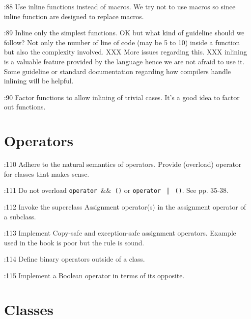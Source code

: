 \documentclass{book}
\newcommand{\name}[1]{\texttt{#1}}
\begin{document}
\cite{OKL_MisfeldtBumgardnerGray2004CppStyle}:88 Use inline functions instead of macros. We try not to use macros so since inline function are designed to replace macros.

\cite{OKL_MisfeldtBumgardnerGray2004CppStyle}:89 Inline only the simplest functions. OK but what kind of guideline should we follow? Not only the number of line of code (may be 5 to 10) inside a function but also the complexity involved. XXX More issues regarding this. XXX inlining is a valuable feature provided by the language hence we are not afraid to use it. Some guideline or standard documentation regarding how compilers handle inlining will be helpful. 

\cite{OKL_MisfeldtBumgardnerGray2004CppStyle}:90 Factor functions to allow inlining of trivial cases. It's a good idea to factor out functions.





\chapter{Operators}
\label{cha:Operators}

\cite{OKL_MisfeldtBumgardnerGray2004CppStyle}:110 Adhere to the natural semantics of operators. Provide (overload) operator for classes that makes sense. 

\cite{OKL_MisfeldtBumgardnerGray2004CppStyle}:111 Do not overload \name{operator $\&\&$ ()} or \name{operator $\|$ ()}. See \cite{OKL_Meyers1996MoreEffective} pp. 35-38.

\cite{OKL_MisfeldtBumgardnerGray2004CppStyle}:112 Invoke the superclass Assignment operator(s) in the assignment operator of a subclass.

\cite{OKL_MisfeldtBumgardnerGray2004CppStyle}:113 Implement Copy-safe and exception-safe assignment operators. Example used in the book is poor but the rule is sound.

\cite{OKL_MisfeldtBumgardnerGray2004CppStyle}:114 Define binary operators outside of a class.

\cite{OKL_MisfeldtBumgardnerGray2004CppStyle}:115 Implement a Boolean operator in terms of its opposite.






\chapter{Classes}
\label{cha:class}
\end{document}
